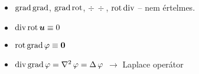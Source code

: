 \documentclass[main.tex]{subfiles}
\begin{document}
\begin{itemize}
  \item $\mathrm{grad} \, \mathrm{grad}$,
        $\mathrm{grad} \, \mathrm{rot}$,
        $\div \, \div$,
        $\mathrm{rot} \, \mathrm{div}$
        – nem értelmes.

  \item $\mathrm{div} \, \mathrm{rot} \, \bm{u} \equiv 0$

  \item $\mathrm{rot} \, \mathrm{grad} \, \varphi \equiv \bm{0}$

  \item $\div \, \grad \, \varphi
          = \laplacian \, \varphi
          = \Delta \, \varphi$
        \hspace{1em} $\rightarrow$ \hspace{1em}
        Laplace operátor
\end{itemize}

\pagebreak
\end{document}
